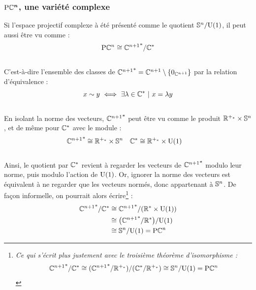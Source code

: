 \subsubsection{$\bf{\PC{n}}$, une variété complexe} \label{subsec:PC^n_variet}

Si l'espace projectif complexe à été présenté comme le quotient $\S{n}/\U{1}$, il peut aussi être vu comme :
\[\PC{n} \cong {\C^{n+1}}^*/\C^*\]
\\
C'est-à-dire l'ensemble des classes de ${\C^{n+1}}^* = \C^{n+1} \setminus \{0_{\C^{n+1}}\}$ par la relation d'équivalence :
\[x \sim y\ \Llr\ \exists \lambda\in\C^*\ |\ x=\lambda y\]
\\
En isolant la norme des vecteurs, ${\C^{n+1}}^*$ peut être vu comme le produit $\R^{+_*} \times \S{n}$, et de même pour $\C^*$ avec le module :
\begin{align*}
	{\C^{n+1}}^* &\cong \R^{+_*} \times \S{n}  &  \C^* &\cong \R^{+_*} \times \U{1}
\end{align*}
\\
Ainsi, le quotient par $\C^*$ revient à regarder les vecteurs de ${\C^{n+1}}^*$ modulo leur norme, puis modulo l'action de $\U{1}$. Or, ignorer la norme des vecteurs est équivalent à ne regarder que les vecteurs normés, donc appartenant à $\S{n}$. De façon informelle, on pourrait alors écrire\footnote{\itshape
	Ce qui s'écrit plus justement avec le troisième théorème d'isomorphisme : \[{\C^{n+1}}^*/\C^* \cong ({\C^{n+1}}^* / \R^{+_*})/(\C^* / \R^{+_*}) \cong \S{n}/\U{1} = \PC{n}\]
} :
\begin{align*}
	{\C^{n+1}}^*/\C^* &\cong {\C^{n+1}}^*/(\R^* \times \U{1})\\
	&\cong \big( {\C^{n+1}}^*/\R^* \big) /\U{1} \\
	&\cong \S{n}  / \U{1} = \PC{n} 
\end{align*}
\skipl

